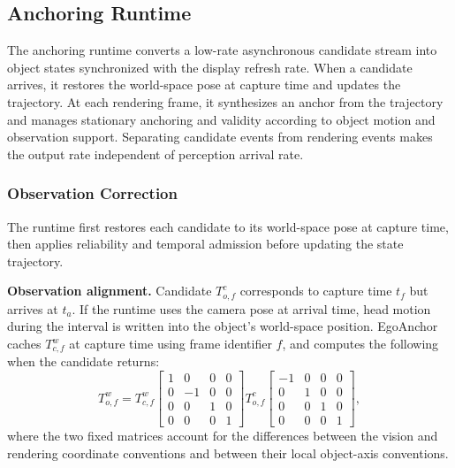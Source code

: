 \documentclass[review]{vgtc}
\begin{document}
\subsection{Anchoring Runtime}\label{sec:anchoring}

The anchoring runtime converts a low-rate asynchronous candidate stream into object states synchronized with the display refresh rate. When a candidate arrives, it restores the world-space pose at capture time and updates the trajectory. At each rendering frame, it synthesizes an anchor from the trajectory and manages stationary anchoring and validity according to object motion and observation support. Separating candidate events from rendering events makes the output rate independent of perception arrival rate.

\subsubsection{Observation Correction}\label{sec:obs-update}

The runtime first restores each candidate to its world-space pose at capture time, then applies reliability and temporal admission before updating the state trajectory.

\textbf{Observation alignment.} Candidate $T_{o,f}^{c}$ corresponds to capture time $t_f$ but arrives at $t_a$. If the runtime uses the camera pose at arrival time, head motion during the interval is written into the object's world-space position. EgoAnchor caches $T_{c,f}^{w}$ at capture time using frame identifier $f$, and computes the following when the candidate returns:
\begin{equation}
T_{o,f}^{w} = T_{c,f}^{w}
\begin{bmatrix}
1 & 0 & 0 & 0 \\
0 & -1 & 0 & 0 \\
0 & 0 & 1 & 0 \\
0 & 0 & 0 & 1
\end{bmatrix}
T_{o,f}^{c}
\begin{bmatrix}
-1 & 0 & 0 & 0 \\
0 & 1 & 0 & 0 \\
0 & 0 & 1 & 0 \\
0 & 0 & 0 & 1
\end{bmatrix},
\label{eq:capture-alignment}
\end{equation}
where the two fixed matrices account for the differences between the vision and rendering coordinate conventions and between their local object-axis conventions.
\end{document}
